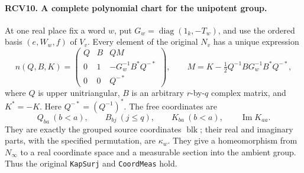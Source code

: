 \paragraph{RCV10. A complete polynomial chart for the unipotent group.}
\label{claim:RCV10}
At one real place fix a word \(w\), put
\(G_w=\operatorname{diag}(1_k,-T_w)\), and use the ordered basis
\((e,W_w,f)\) of \(V_v\).  Every element of the original
\(N_v\) has a unique expression
\[
 n(Q,B,K)=
 \begin{pmatrix}
 Q&B&QM\\
 0&1&-G_w^{-1}B^*Q^{-*}\\
 0&0&Q^{-*}
 \end{pmatrix},\qquad
 M=K-\tfrac12Q^{-1}BG_w^{-1}B^*Q^{-*},
\tag{RCV.15}
\]
where \(Q\) is upper unitriangular, \(B\) is an arbitrary
\(r\)-by-\(q\) complex matrix, and \(K^*=-K\).  Here
\(Q^{-*}=(Q^{-1})^*\).
The free coordinates are
\[
 Q_{ba}\ (b<a),\qquad B_{bj}\ (j\leq q),\qquad
 K_{ba}\ (b<a),\qquad \operatorname{Im}K_{aa}.
\tag{RCV.16}
\]
They are exactly the grouped source coordinates \(\operatorname{blk}\);
their real and imaginary parts, with the specified permutation, are
\(\kappa_w\).  They give a homeomorphism from \(N_\infty\) to a
real coordinate space and a measurable section into the ambient group.
Thus the original \texttt{KapSurj} and \texttt{CoordMeas} hold.

